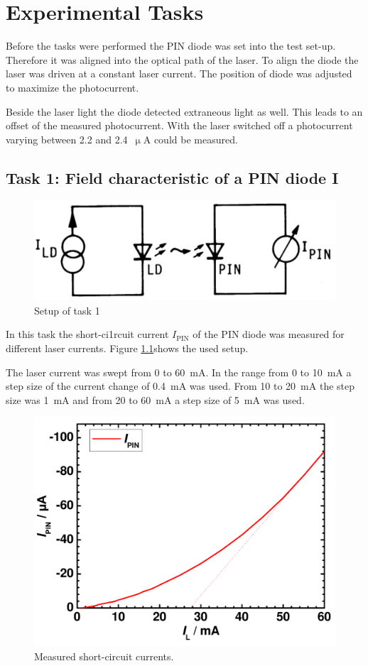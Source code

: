 \chapter{Experimental Tasks}

Before the tasks were performed the PIN diode was set into the test set-up. Therefore it was aligned into the optical path of the laser. To align the diode the laser was driven at a constant laser current. The position of diode was adjusted to maximize the photocurrent. 


Beside the laser light the diode detected extraneous light as well. This leads to an offset of the measured photocurrent. With the laser switched off a photocurrent varying between 2.2 and 2.4~$\upmu$A could be measured.

\section{Task 1: Field characteristic of a PIN diode I}
\label{T1}
\begin{figure}%
\centering
\includegraphics[width=.5\columnwidth]{Grafiken/T1_setup.jpg}%
\caption{Setup of task 1}%
\label{fig:T1_setup}%
\end{figure}
In this task the short-ci1rcuit current $I_{\mathrm{PIN}}$ of the PIN diode was measured for different laser currents. Figure \ref{fig:T1_setup}\footnotemark[3] shows the used setup. 

The laser current was swept from 0 to 60~mA. In the range from 0 to 10~mA a step size of the current change of 0.4~mA was used. From 10 to 20~mA the step size was 1~mA and from 20 to 60~mA a step size of 5~mA was used. 

\begin{figure}%
\centering
\includegraphics[width=.5\columnwidth]{Grafiken/T1_laser.pdf}%
\caption{Measured short-circuit currents.}%
\label{fig:T1_laser}%
\end{figure}

